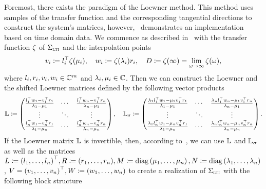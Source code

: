 Foremost, there exists the paradigm of the Loewner method.
This method uses samples of the transfer function and the corresponding tangential directions to construct the system's matrices, however,~\cite{Peherstorfer2017} demonstrates an implementation based on time domain data.
We commence as described in~\cite{BGD2020} with the transfer function $\zeta$ of $\Sigma_{\textnormal{\scshape lti}}$ and the interpolation points
\begin{equation*}
    v_i \coloneqq l_i^{\top} \zeta(\mu_i),\quad w_i \coloneqq \zeta(\lambda_i) r_i,\quad D\coloneqq \zeta(\infty) = \lim\limits_{\omega \to \infty} \zeta(\omega),
\end{equation*}
where $l_i, r_i, v_i, w_i \in \mathbb{C}^m$ and $\lambda_i, \mu_i \in \mathbb{C}$.
Then we can construct the Loewner and the shifted Loewner matrices defined by the following vector products
\begin{equation}\label{eq:loewner-matrices}
    \mathbb{L} \coloneqq \begin{pmatrix}
        \frac{l_1^{\top} w_1  - v_1^{\top} r_1}{\lambda_1 - \mu_1} & \cdots & \frac{l_1^{\top} w_n  - v_1^{\top} r_n}{\lambda_n - \mu_1} \\
        \vdots & \ddots & \vdots \\
        \frac{l_n^{\top} w_1  - v_n^{\top} r_1}{\lambda_1 - \mu_n} & \cdots & \frac{l_n^{\top} w_n  - v_n^{\top} r_n}{\lambda_n - \mu_n}
    \end{pmatrix},\quad \mathbb{L}_\sigma \coloneqq \begin{pmatrix}
        \frac{\lambda_1 l_1^{\top} w_1 - \mu_1 v_1^{\top} r_1}{\lambda_1 - \mu_1} & \cdots & \frac{\lambda_n l_1^{\top} w_n - \mu_1 v_1^{\top} r_n}{\lambda_n - \mu_1} \\
        \vdots & \ddots & \vdots \\
        \frac{\lambda_1 l_n^{\top} w_1 - \mu_n v_n^{\top} r_1}{\lambda_1 - \mu_n} & \cdots & \frac{\lambda_n l_n^{\top} w_n - \mu_n v_n^{\top} r_n}{\lambda_n - \mu_n}
    \end{pmatrix}.
\end{equation}
If the Loewner matrix $\mathbb{L}$ is invertible, then, according to~\cite[Theorem~5.1]{BGD2020}, we can use $\mathbb{L}$ and $\mathbb{L}_\sigma$ as well as the matrices $L \coloneqq {(l_1, \dots, l_n)}^{\top}, R \coloneqq (r_1, \dots, r_n), M \coloneqq \mathop{}\!\mathrm{diag}\left(\mu_1, \dots, \mu_n\right), N \coloneqq \mathop{}\!\mathrm{diag}\left(\lambda_1, \dots, \lambda_n\right)$, $V = {(v_1, \dots, v_n)}^{\top}, W \coloneqq (w_1, \dots, w_n)$ to create a realization of $\Sigma_{\textnormal{\scshape lti}}$ with the following block structure
